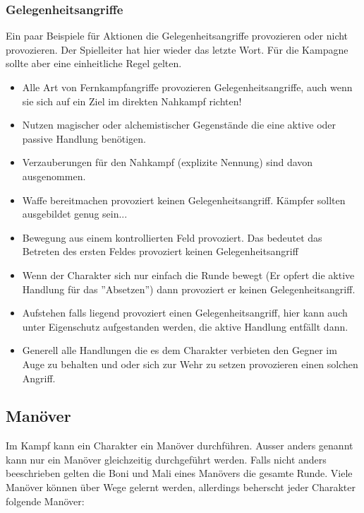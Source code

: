 \documentclass{article}
\begin{document}
\subsubsection{Gelegenheitsangriffe}

Ein paar Beispiele für Aktionen die Gelegenheitsangriffe provozieren oder nicht provozieren. Der Spielleiter hat hier
wieder das letzte Wort. Für die Kampagne sollte aber eine einheitliche Regel gelten.

\begin{itemize}
\item Alle Art von Fernkampfangriffe provozieren Gelegenheitsangriffe, auch wenn sie sich auf ein Ziel im direkten Nahkampf richten!
\item Nutzen magischer oder alchemistischer Gegenstände die eine aktive oder passive Handlung benötigen.
\item Verzauberungen für den Nahkampf (explizite Nennung) sind davon ausgenommen.
\item Waffe bereitmachen provoziert keinen Gelegenheitsangriff. Kämpfer sollten ausgebildet genug sein...
\item Bewegung aus einem kontrollierten Feld provoziert. Das bedeutet das Betreten des ersten Feldes provoziert keinen Gelegenheitsangriff
\item Wenn der Charakter sich nur einfach die Runde bewegt (Er opfert die aktive Handlung für das ''Absetzen'') dann provoziert er keinen Gelegenheitsangriff.
\item Aufstehen falls liegend provoziert einen Gelegenheitsangriff, hier kann auch unter Eigenschutz aufgestanden werden, die aktive Handlung entfällt dann.
\item Generell alle Handlungen die es dem Charakter verbieten den Gegner im Auge zu behalten und oder sich zur Wehr zu setzen provozieren einen solchen Angriff.
\end{itemize}

\begin{center}
\subsection{Manöver}
\end{center}

Im Kampf kann ein Charakter ein Manöver durchführen. Ausser anders genannt kann nur ein Manöver gleichzeitig
durchgeführt werden. Falls nicht anders beeschrieben gelten die Boni und Mali eines Manövers die gesamte Runde.
Viele Manöver können über Wege gelernt werden, allerdings beherscht jeder Charakter folgende Manöver:
\end{document}
